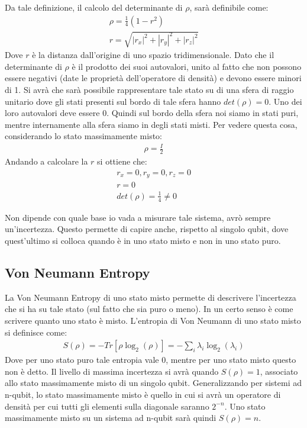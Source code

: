 Da tale definizione, il calcolo del determinante di \(\rho\), sarà definibile come:
\begin{gather*}
    \rho = \frac{1}{4}(1-r^2)\\
    r = \sqrt{|r_x|^2 + |r_y|^2 + |r_z|^2}
\end{gather*}
Dove \(r\) è la distanza dall'origine di uno spazio tridimensionale. Dato che il determinante di \(\rho\) è il prodotto dei suoi autovalori, unito al fatto che non possono essere negativi (date le proprietà dell'operatore di densità) e devono essere minori di 1. Si avrà che sarà possibile rappresentare tale stato su di una sfera di raggio unitario dove gli stati presenti sul bordo di tale sfera hanno \(det(\rho)= 0\). Uno dei loro autovalori deve essere 0. Quindi sul bordo della sfera noi siamo in stati puri, mentre internamente alla sfera siamo in degli stati misti. Per vedere questa cosa, considerando lo stato massimamente misto:
\begin{gather*}
    \rho = \frac{I}{2}
\end{gather*}
Andando a calcolare la \(r\) si ottiene che:
\begin{gather*}
    r_x = 0, r_y = 0, r_z = 0\\
    r = 0\\
    det(\rho) = \frac{1}{4} \ne 0
\end{gather*}

Non dipende con quale base io vada a misurare tale sistema, avrò sempre un'incertezza. Questo permette di capire anche, rispetto al singolo qubit, dove quest'ultimo si colloca quando è in uno stato misto e non in uno stato puro. 

\subsection{Von Neumann Entropy}
La Von Neumann Entropy di uno stato misto permette di descrivere l'incertezza che si ha su tale stato (sul fatto che sia puro o meno). In un certo senso è come scrivere quanto uno stato è misto. L'entropia di Von Neumann di uno stato misto si definisce come:
\begin{gather*}
    S(\rho) = - Tr[\rho \log_2(\rho)] = -\sum_i \lambda_i \log_2(\lambda_i)
\end{gather*}
Dove per uno stato puro tale entropia vale 0, mentre per uno stato misto questo non è detto. Il livello di massima incertezza si avrà quando \(S(\rho) = 1\), associato allo stato massimamente misto di un singolo qubit. 
Generalizzando per sistemi ad n-qubit, lo stato massimamente misto è quello in cui si avrà un operatore di densità per cui tutti gli elementi sulla diagonale saranno \(2^{-n}\). Uno stato massimamente misto su un sistema ad n-qubit sarà quindi \(S(\rho) = n\). 

